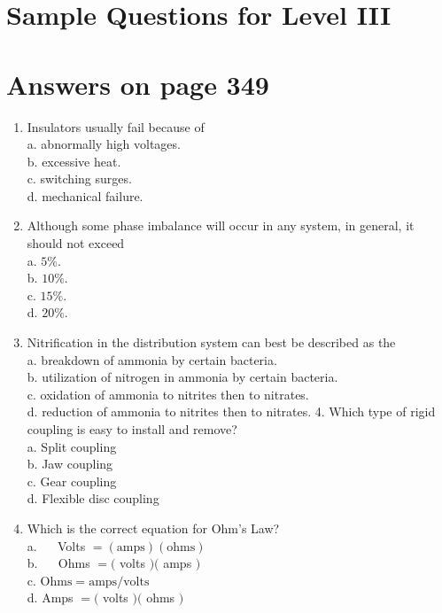 \documentclass[10pt]{article}
\begin{document}
\section{Sample Questions for Level III}
\section{Answers on page 349}
\begin{enumerate}
  \item Insulators usually fail because of\\
a. abnormally high voltages.\\
b. excessive heat.\\
c. switching surges.\\
d. mechanical failure.

  \item Although some phase imbalance will occur in any system, in general, it should not exceed\\
a. $5 \%$.\\
b. $10 \%$.\\
c. $15 \%$.\\
d. $20 \%$.

  \item Nitrification in the distribution system can best be described as the\\
a. breakdown of ammonia by certain bacteria.\\
b. utilization of nitrogen in ammonia by certain bacteria.\\
c. oxidation of ammonia to nitrites then to nitrates.\\
d. reduction of ammonia to nitrites then to nitrates. 4. Which type of rigid coupling is easy to install and remove?\\
a. Split coupling\\
b. Jaw coupling\\
c. Gear coupling\\
d. Flexible disc coupling

  \item Which is the correct equation for Ohm's Law?\\
a. $\quad$ Volts $=(\mathrm{amps})(\mathrm{ohms})$\\
b. $\quad$ Ohms $=($ volts $)($ amps $)$\\
c. $\mathrm{Ohms}=\mathrm{amps} / \mathrm{volts}$\\
d. Amps $=($ volts $)($ ohms $)$

\end{enumerate}
\end{document}
